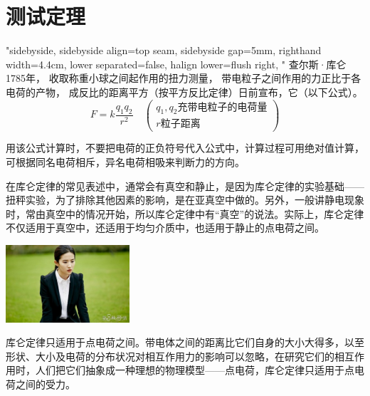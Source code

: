 \documentclass{ctexart}
\numberwithin{theorem}{section}%
\begin{document}
\section{测试定理}

\begin{theo}[Title]
 \lipsum[1]
\end{theo}

\begin{law}[库仑定律]"sidebyside, 
sidebyside align=top seam,
sidebyside gap=5mm,
righthand width=4.4cm,
lower separated=false,%
halign lower=flush right,
"%
查尔斯·库仑1785年，
收取称重小球之间起作用的扭力测量，
带电粒子之间作用的力正比于各电荷的产物，
成反比的距离平方（按平方反比定律）日前宣布，它（以下公式）。
\begin{equation*}
 F=k\frac{q_1 q_2}{r^2} \quad
\left(
\begin{array}{ll}
  q_1, q_2\text{充带电粒子的电荷量}\\[3pt]
 r\text{粒子距离}
\end{array}
\right)
\end{equation*}

用该公式计算时，不要把电荷的正负符号代入公式中，计算过程可用绝对值计算，可根据同名电荷相斥，异名电荷相吸来判断力的方向。

在库仑定律的常见表述中，通常会有真空和静止，是因为库仑定律的实验基础——扭秤实验，为了排除其他因素的影响，是在亚真空中做的。另外，一般讲静电现象时，常由真空中的情况开始，所以库仑定律中有“真空”的说法。实际上，库仑定律不仅适用于真空中，还适用于均匀介质中，也适用于静止的点电荷之间。

\tcblower
 \includegraphics[width=4.6cm]{lyf.jpg}
\end{law}

库仑定律只适用于点电荷之间。带电体之间的距离比它们自身的大小大得多，以至形状、大小及电荷的分布状况对相互作用力的影响可以忽略，在研究它们的相互作用时，人们把它们抽象成一种理想的物理模型——点电荷，库仑定律只适用于点电荷之间的受力。
\end{document}
